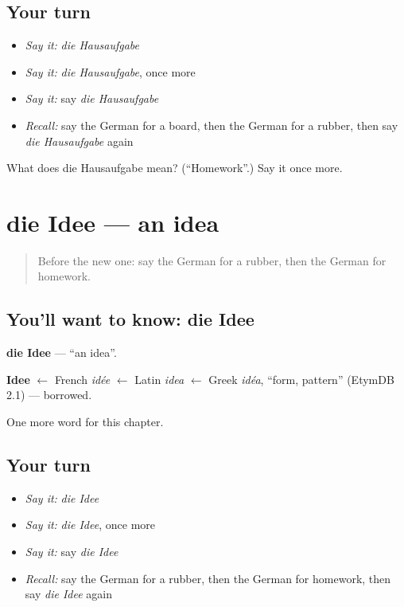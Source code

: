 \subsection*{Your turn}
\begin{itemize}
\raggedright
  \item \emph{Say it:} \emph{die Hausaufgabe}
  \item \emph{Say it:} \emph{die Hausaufgabe}, once more
  \item \emph{Say it:} say \emph{die Hausaufgabe}
  \item \emph{Recall:} say the German for a board, then the German for a rubber, then say \emph{die Hausaufgabe} again
\end{itemize}

\begin{tcolorbox}[breakable,colback=teal!4,colframe=teal!35!black,title={Before you move on}]
What does die Hausaufgabe mean? (\textquotedblleft{}Homework\textquotedblright{}.) Say it once more.
\end{tcolorbox}
\section[die Idee]{die Idee — an idea}

\label{lesson:GE-C128-idee}



\begin{quote}
Before the new one: say the German for a rubber, then the German for homework.
\end{quote}

\subsection*{You'll want to know: die Idee}
\textbf{die Idee} — \textquotedblleft{}an idea\textquotedblright{}.

\begin{cousinweb}
\textbf{Idee} $\leftarrow$ French \emph{idée} $\leftarrow$ Latin \emph{idea} $\leftarrow$ Greek \emph{idéa}, \textquotedblleft{}form, pattern\textquotedblright{} (EtymDB 2.1) — borrowed.
\end{cousinweb}

\begin{grammarlens}[title={What you've built}]
One more word for this chapter.
\end{grammarlens}

\subsection*{Your turn}
\begin{itemize}
\raggedright
  \item \emph{Say it:} \emph{die Idee}
  \item \emph{Say it:} \emph{die Idee}, once more
  \item \emph{Say it:} say \emph{die Idee}
  \item \emph{Recall:} say the German for a rubber, then the German for homework, then say \emph{die Idee} again
\end{itemize}

